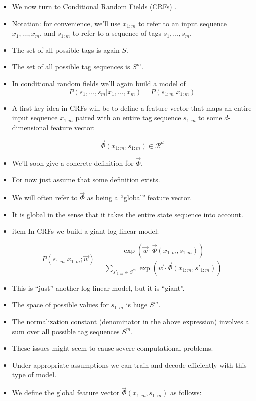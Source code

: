 \begin{itemize}

\item  We now turn to Conditional Random Fields (CRFs) \cite{LaffertyMP01}.

\item Notation: for convenience, we'll use $x_{1:m}$ to refer to an input sequence $x_1 ,\dots,x_m$, and $s_{1:m}$ to refer to a sequence of tags $s_1, \dots, s_m$.

\item The set of all possible tags is again $S$.

\item The set of all possible tag sequences is $S^m$.

\item In conditional random fields we'll again build a model of
\begin{displaymath}
 P(s_1, \dots, s_m | x_1, \dots, x_m) = P(s_{1:m}|x_{1:m})
\end{displaymath}


\item A first key idea in CRFs will be to define a feature vector  that maps an entire input sequence $x_{1:m}$ paired with an entire tag sequence $s_{1:m}$ to some $d$-dimensional feature vector:

\begin{displaymath}
 \vec{\Phi}(x_{1:m},s_{1:m}) \in \mathcal{R}^d
\end{displaymath}

\item We'll soon give a concrete definition for $\vec{\Phi}$.
\item  For now just assume that some definition exists. 
\item We will often refer to $\vec{\Phi}$ as being a ``global'' feature vector.
\item It is global in the sense that it takes the entire state
sequence into account.

\item item In CRFs we build a giant log-linear model:

\begin{displaymath}
 P(s_{1:m}|x_{1:m}; \vec{w}) = \frac{\exp (\vec{w} \cdot \vec{\Phi}(x_{1:m},s_{1:m}))}{\sum_{s'_{1:m} \in S^m}\exp (\vec{w} \cdot \vec{\Phi}(x_{1:m},s'_{1:m}))}
\end{displaymath}

\item This is ``just'' another log-linear model, but it is ``giant''.
\item The space of possible values for $s_{1:m}$ is huge $S^m$. 
\item The normalization constant (denominator in the above expression) involves a sum over all possible tag sequences $S^m$.
\item These issues might seem to cause severe computational problems.
\item  Under appropriate assumptions we can train and decode efficiently
with this type of model.
\item  We define the global feature vector $\vec{\Phi}(x_{1:m},s_{1:m})$ as follows: 


\end{itemize}
